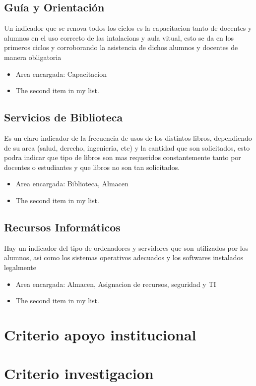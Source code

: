 \documentclass[12pt,a4paper]{report}
\begin{document}
\subsection{Guía y Orientación}
Un indicador que se renova todos los ciclos es la capacitacion tanto de docentes y alumnos en el uso correcto de las intalacions y aula vitual, esto se da en los primeros ciclos y corroborando la asistencia de dichos alumnos y docentes de manera obligatoria
\begin{itemize}
\item Area encargada: Capacitacion
\item The second item in my list.
\end{itemize}
\subsection{Servicios de Biblioteca}
Es un claro indicador de la frecuencia de usos de los distintos libros, dependiendo de su area (salud, derecho, ingenieria, etc) y la cantidad que son solicitados, esto podra indicar que tipo de libros son mas requeridos constantemente tanto por docentes o estudiantes y que libros no son tan solicitados.
\begin{itemize}
\item Area encargada: Biblioteca, Almacen
\item The second item in my list.
\end{itemize}
\subsection{Recursos Informáticos }
Hay un indicador del tipo de ordenadores y servidores que son utilizados por los alumnos,  asi como los sistemas operativos adecuados y los softwares instalados legalmente
\begin{itemize}
\item Area encargada: Almacen, Asignacion de recursos, seguridad y TI
\item The second item in my list.
\end{itemize}


\section{ Criterio apoyo institucional}

\section{ Criterio investigacion}
\end{document}

